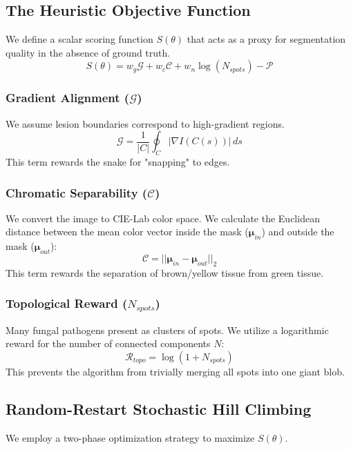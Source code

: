 \documentclass[journal]{IEEEtran}
\begin{document}
\subsection{The Heuristic Objective Function}
We define a scalar scoring function $S(\theta)$ that acts as a proxy for segmentation quality in the absence of ground truth.
\begin{equation}
S(\theta) = w_g \mathcal{G} + w_c \mathcal{C} + w_n \log(N_{spots}) - \mathcal{P}
\end{equation}

\subsubsection{Gradient Alignment ($\mathcal{G}$)}
We assume lesion boundaries correspond to high-gradient regions.
\begin{equation}
\mathcal{G} = \frac{1}{|C|} \oint_C |\nabla I(C(s))| \, ds
\end{equation}
This term rewards the snake for "snapping" to edges.

\subsubsection{Chromatic Separability ($\mathcal{C}$)}
We convert the image to CIE-Lab color space. We calculate the Euclidean distance between the mean color vector inside the mask ($\bm{\mu}_{in}$) and outside the mask ($\bm{\mu}_{out}$):
\begin{equation}
\mathcal{C} = || \bm{\mu}_{in} - \bm{\mu}_{out} ||_2
\end{equation}
This term rewards the separation of brown/yellow tissue from green tissue.

\subsubsection{Topological Reward ($N_{spots}$)}
Many fungal pathogens present as clusters of spots. We utilize a logarithmic reward for the number of connected components $N$:
\begin{equation}
\mathcal{R}_{topo} = \log(1 + N_{spots})
\end{equation}
This prevents the algorithm from trivially merging all spots into one giant blob.

\subsection{Random-Restart Stochastic Hill Climbing}
We employ a two-phase optimization strategy to maximize $S(\theta)$.
\end{document}
